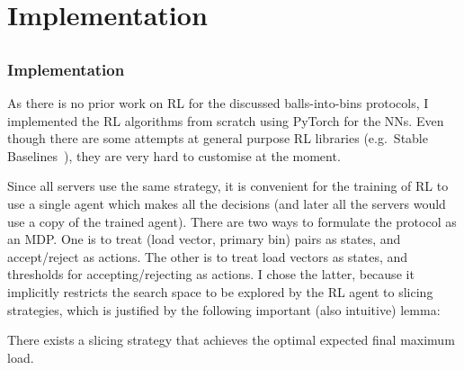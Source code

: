 \chapter{Implementation}\label{implementation}

\ifpdf
    \graphicspath{{Chapter3/Figs/Raster/}{Chapter3/Figs/PDF/}{Chapter3/Figs/}}
\else
    \graphicspath{{Chapter3/Figs/Vector/}{Chapter3/Figs/}}
\fi



\section{\TwoThinning}





\subsection{\DQL Implementation} \label{dqn-implmentation-two-thinning}


As there is no prior work on RL for the discussed balls-into-bins protocols, I implemented the RL algorithms from scratch using PyTorch for the NNs. Even though there are some attempts at general purpose RL libraries (e.g.\ Stable Baselines~\cite{hill2018stablebaselines}), they are very hard to customise at the moment.


Since all servers use the same strategy, it is convenient for the training of RL to use a single agent which makes all the decisions (and later all the servers would use a copy of the trained agent). There are two ways to formulate the \TwoThinning protocol as an MDP. One is to treat (load vector, primary bin) pairs as states, and accept/reject as actions. The other is to treat load vectors as states, and thresholds for accepting/rejecting as actions. I chose the latter, because it implicitly restricts the search space to be explored by the RL agent to slicing strategies, which is justified by the following important (also intuitive) lemma:


\begin{lemma}  \label{lemma: thresholdproperty}
There exists a slicing strategy that achieves the optimal expected final maximum load.
\end{lemma}


